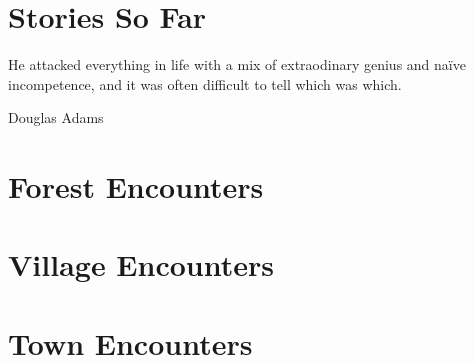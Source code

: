 \documentclass[a4paper,openany]{book}
\begin{document}
\chapter{Stories So Far}
	\epigraph{He attacked everything in life with a mix of extraodinary genius and na\"ive incompetence, and it was often difficult to tell which was which.}{Douglas Adams}



\chapter{Forest Encounters}

\newcommand{\lescounter}{\addtocounter{enc}{-1}}



\chapter{Village Encounters}



\chapter{Town Encounters}





\printglossary

\printindex


\end{document}
